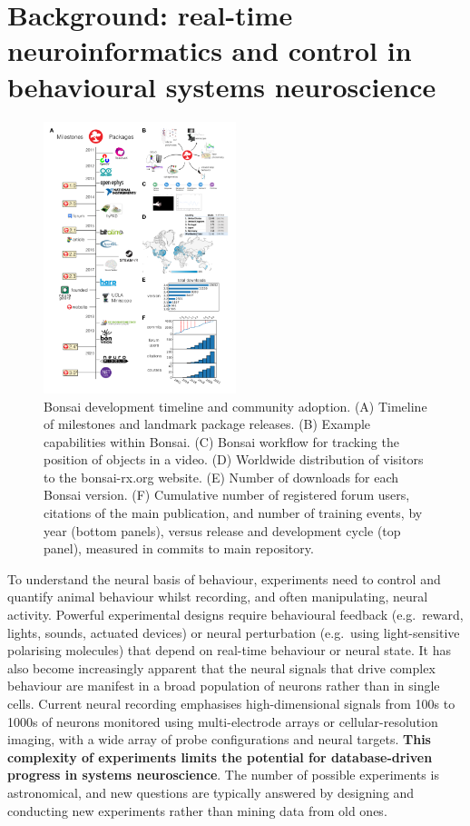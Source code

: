 \section{Background: real-time neuroinformatics and control in behavioural systems
  neuroscience}
  
\setlength{\columnsep}{1em}
\begin{figure}
    \includegraphics[width=0.5\textwidth]{figures/roadmap-bbsrc-2x_cropped.pdf}

  \caption{Bonsai development timeline and community adoption. (A) Timeline of
    milestones and landmark package releases. (B) Example capabilities 
    within Bonsai. (C) Bonsai workflow for tracking the position of objects
    in a video. (D) Worldwide
    distribution of visitors to the bonsai-rx.org website. (E)
    Number of downloads for each Bonsai version. (F) Cumulative number of
    registered forum users, citations of the main publication, and number of
    training events, by year (bottom panels), versus release and development
    cycle (top panel), measured in commits to main repository. 
    }

  \label{fig:bonsai}
\end{figure}

To understand the neural basis of behaviour, experiments need to control and quantify animal behaviour whilst recording, and often manipulating, neural activity. 
%
Powerful experimental designs require behavioural feedback (e.g.\ reward, lights, sounds, actuated
devices) or neural perturbation (e.g.\ using light-sensitive polarising
molecules) that depend on real-time behaviour or neural state.
%
It has also become increasingly apparent that the neural signals that
drive complex behaviour are manifest in a broad population of neurons rather
than in single cells. Current neural recording emphasises high-dimensional
signals from 100s to 1000s of neurons monitored using multi-electrode arrays or cellular-resolution imaging, with a wide array of probe configurations and neural targets.
%
\textbf{This complexity of experiments limits the potential for database-driven progress in systems neuroscience}. The number of possible experiments is astronomical, and new questions are typically answered by designing and conducting new experiments rather than mining data from old ones.


